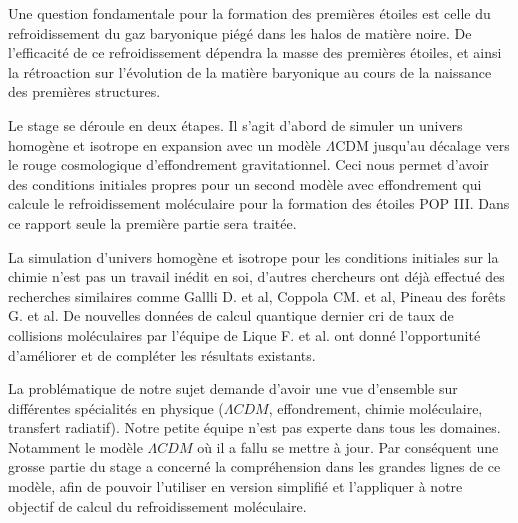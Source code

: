 \documentclass[10pt, a4paper]{report}
\numberwithin{equation}{subsection}
\begin{document}
Une question fondamentale pour la formation des premières étoiles est celle du refroidissement du gaz baryonique piégé dans les halos de matière noire. De l'efficacité de ce refroidissement dépendra la masse des premières étoiles, et ainsi la rétroaction sur l'évolution de la matière baryonique au cours de la naissance des premières structures. 

Le stage se déroule en deux étapes. Il s'agit d'abord de simuler un univers homogène et isotrope en expansion avec un modèle $\Lambda$CDM jusqu'au décalage vers le rouge cosmologique d'effondrement gravitationnel. Ceci nous permet d'avoir des conditions initiales propres pour un second modèle avec effondrement qui calcule le refroidissement moléculaire pour la formation des étoiles POP III. Dans ce rapport seule la première partie sera traitée.

La simulation d'univers homogène et isotrope pour les conditions initiales sur la chimie n'est pas un travail inédit en soi, d'autres chercheurs ont déjà effectué des recherches similaires comme Gallli D. et al, Coppola CM. et al, Pineau des forêts G. et al. De nouvelles données de calcul quantique dernier cri de taux de collisions moléculaires par l'équipe de Lique F. et al. ont donné l'opportunité d'améliorer et de compléter les résultats existants. 

La problématique de notre sujet demande d'avoir une vue d'ensemble sur différentes spécialités en physique ($\Lambda CDM$, effondrement, chimie moléculaire, transfert radiatif). Notre petite équipe n'est pas experte dans tous les domaines. Notamment le modèle $\Lambda CDM$ où il a fallu se mettre à jour. Par conséquent une grosse partie du stage a concerné la compréhension dans les grandes lignes de ce modèle, afin de pouvoir l'utiliser en version simplifié et l'appliquer à notre objectif de calcul du refroidissement moléculaire.
\end{document}
